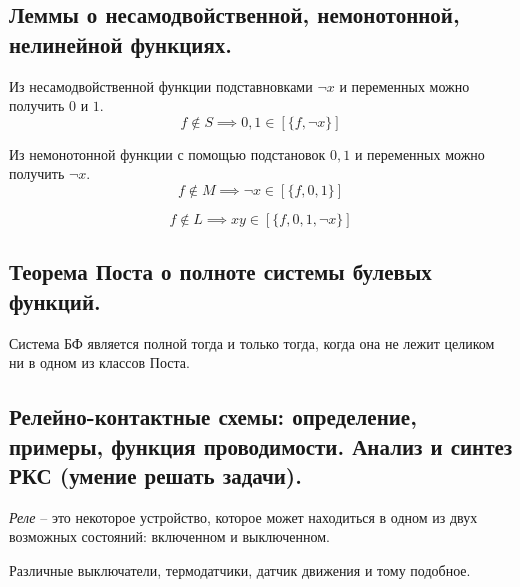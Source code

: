 \newpage

\subsection{Леммы о несамодвойственной, немонотонной, нелинейной функциях.}

\begin{lemma}
    Из несамодвойственной функции подставновками $\lnot x$ и переменных можно получить $0$ и $1$.
    \[
        f \notin S\implies0,1 \in [\{f,\lnot x\}]
    \]
\end{lemma}

\begin{lemma}
    Из немонотонной функции с помощью подстановок $0,1$ и переменных можно получить $\lnot x$.
    \[
        f \notin M\implies\lnot x \in [\{f,0,1\}]
    \]
\end{lemma}

\begin{lemma}
    \[
        f \notin L \implies xy \in [\{f,0,1,\lnot x\}]
    \]
\end{lemma}

\subsection{Теорема Поста о полноте системы булевых функций.}

\begin{theorem}
    Система БФ является полной тогда и только тогда, когда она не лежит целиком ни в одном из классов Поста.
\end{theorem}

\subsection{Релейно-контактные схемы: определение, примеры, функция проводимости. Анализ и синтез РКС (умение решать задачи).}

\begin{definition}[Реле]
    \emph{Реле} -- это некоторое устройство, которое может находиться в одном из двух возможных состояний: включенном и выключенном.
\end{definition}

\begin{example}
    Различные выключатели, термодатчики, датчик движения и тому подобное.
\end{example}

